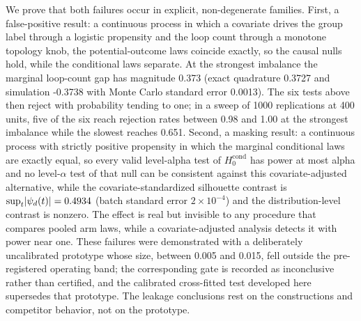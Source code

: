 We prove that both failures occur in explicit, non-degenerate families. First, a false-positive result: a continuous process in which a covariate drives the group label through a logistic propensity and the loop count through a monotone topology knob, the potential-outcome laws coincide exactly, so the causal nulls hold, while the conditional laws separate. At the strongest imbalance the marginal loop-count gap has magnitude 0.373 (exact quadrature 0.3727 and simulation -0.3738 with Monte Carlo standard error 0.0013). The six tests above then reject with probability tending to one; in a sweep of 1000 replications at 400 units, five of the six reach rejection rates between 0.98 and 1.00 at the strongest imbalance while the slowest reaches 0.651. Second, a masking result: a continuous process with strictly positive propensity in which the marginal conditional laws are exactly equal, so every valid level-alpha test of $H_0^{\mathrm{cond}}$ has power at most alpha and no level-$\alpha$ test of that null can be consistent against this covariate-adjusted alternative, while the covariate-standardized silhouette contrast is $\sup_t \lvert \psi_d(t)\rvert = 0.4934$ (batch standard error $2\times10^{-4}$) and the distribution-level contrast is nonzero. The effect is real but invisible to any procedure that compares pooled arm laws, while a covariate-adjusted analysis detects it with power near one. These failures were demonstrated with a deliberately uncalibrated prototype whose size, between 0.005 and 0.015, fell outside the pre-registered operating band; the corresponding gate is recorded as inconclusive rather than certified, and the calibrated cross-fitted test developed here supersedes that prototype. The leakage conclusions rest on the constructions and competitor behavior, not on the prototype.

